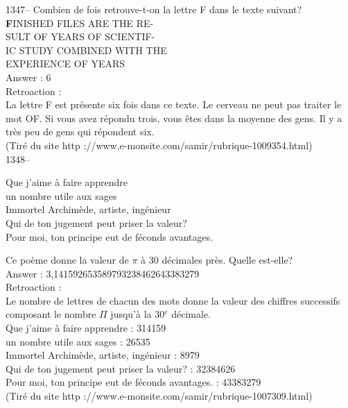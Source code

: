 ﻿\documentclass[letterpaper, 12pt]{article}
\begin{document}
1347-- Combien de fois retrouve-t-on la lettre F dans le texte suivant?\\

{\Large\textbf FINISHED FILES ARE THE RE-\\
SULT OF YEARS OF SCIENTIF-\\
IC STUDY COMBINED WITH THE \\
EXPERIENCE OF YEARS}\\


Answer : 6\\

Retroaction : \\
La lettre F est pr\'esente six fois dans ce texte. Le cerveau ne
peut pas traiter le mot \og OF\fg .  Si vous avez r\'epondu trois,
vous \^etes dans la moyenne des gens.  Il y a tr\`es peu de gens qui r\'epondent six.  \\
(Tir\'e du site http ://www.e-monsite.com/samir/rubrique-1009354.html)\\

1348-- \begin{center}{Que j'aime \`a faire apprendre\\
un nombre utile aux sages\\
Immortel Archim\`ede, artiste, ing\'enieur\\
Qui de ton jugement peut priser la valeur?\\
Pour moi, ton principe eut de f\'econds avantages.\\}\end{center} Ce
po\`eme donne la valeur de $\pi$ \`a 30 d\'ecimales pr\`es. Quelle
est-elle?\\

Answer : 3,141592653589793238462643383279\\

Retroaction : \\
Le nombre de lettres de chacun des mots donne la valeur des chiffres
successifs composant le nombre $\Pi$ jusqu'\`a la 30$^e$ d\'ecimale.\\

Que j'aime \`a faire apprendre : 314159\\
un nombre utile aux sages : 26535\\
Immortel Archim\`ede, artiste, ing\'enieur : 8979\\
Qui de ton jugement peut priser la valeur? : 32384626\\
Pour moi, ton principe eut de f\'econds avantages. : 43383279\\
(Tir\'e du site http ://www.e-monsite.com/samir/rubrique-1007309.html)\\
\end{document}
